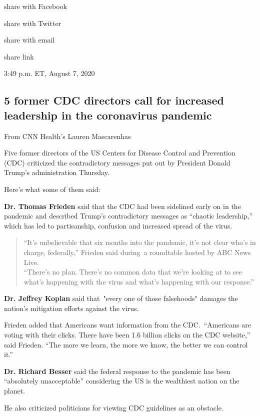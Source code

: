 share with Facebook

share with Twitter

share with email

share link

3:49 p.m. ET, August 7, 2020

\hypertarget{5-former-cdc-directors-call-for-increased-leadership-in-the-coronavirus-pandemic}{%
\subsection{5 former CDC directors call for increased leadership in the
coronavirus
pandemic}\label{5-former-cdc-directors-call-for-increased-leadership-in-the-coronavirus-pandemic}}

From CNN Health's Lauren Mascarenhas

Five former directors of the US Centers for Disease Control and
Prevention (CDC) criticized the contradictory messages put out by
President Donald Trump's administration Thursday.

Here's what some of them said:

\textbf{Dr. Thomas Frieden} said that the CDC had been sidelined early
on in the pandemic and described Trump's contradictory messages as
``chaotic leadership,'' which has led to partisanship, confusion and
increased spread of the virus.

\begin{quote}
``It's unbelievable that six months into the pandemic, it's not clear
who's in charge, federally,'' Frieden said during~a roundtable hosted by
ABC News Live.\\
``There's no plan. There's no common data that we're looking at to see
what's happening with the virus and what's happening with our
response.''
\end{quote}

\textbf{Dr. Jeffrey Koplan} said that~"every one of those falsehoods"
damages the nation's mitigation efforts against the virus.

Frieden added that Americans want information from the CDC.~``Americans
are voting with their clicks. There have been 1.6 billion clicks on the
CDC website,'' said Frieden. ``The more we learn, the more we know, the
better we can control it.''

\textbf{Dr. Richard Besser} said the federal response to the pandemic
has been ``absolutely unacceptable'' considering the US is the
wealthiest nation on the planet.

He also criticized politicians for viewing CDC guidelines as an
obstacle.


